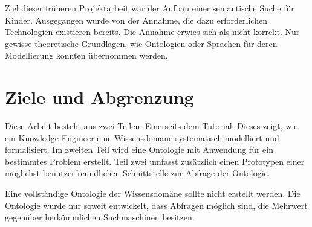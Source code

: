 Ziel dieser früheren Projektarbeit war der Aufbau einer semantische Suche für Kinder. Ausgegangen wurde von der Annahme, die dazu erforderlichen Technologien existieren bereits. Die Annahme erwies sich als nicht korrekt. Nur gewisse theoretische Grundlagen, wie Ontologien oder Sprachen für deren Modellierung konnten übernommen werden.

\section{Ziele und Abgrenzung}
\label{sec:aufgabe_ziele}
Diese Arbeit besteht aus zwei Teilen. Einerseits dem Tutorial. Dieses zeigt, wie ein Knowledge-Engineer eine Wissensdomäne systematisch modelliert und formalisiert. Im zweiten Teil wird eine Ontologie mit Anwendung für ein bestimmtes Problem erstellt. Teil zwei umfasst zusätzlich einen Prototypen einer möglichst benutzerfreundlichen Schnittstelle zur Abfrage der Ontologie.

Eine vollständige Ontologie der Wissensdomäne sollte nicht erstellt werden. Die Ontologie wurde nur soweit entwickelt, dass Abfragen möglich sind, die Mehrwert gegenüber herkömmlichen Suchmaschinen besitzen.
